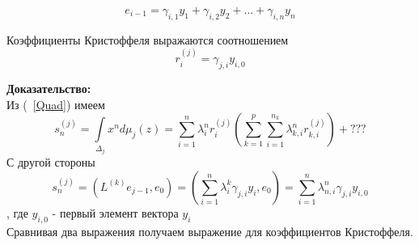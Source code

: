 \begin{equation}
e_{i-1}=\gamma_{i,1}y_1+ \gamma_{i,2}y_2 + \ldots +
\gamma_{i,n}y_n
\end{equation}
\begin{lema} Коэффициенты Кристоффеля выражаются соотношением
$$r_{i}^{(j)}=\gamma_{j,i}y_{i,0}$$
\end{lema}
\textbf{ Доказательство:} \\
Из (~\ref{Quad}) имеем
\begin{equation}
s_n^{(j)} = \int \limits_{\Delta_j} x^n d\mu_j(z) =
\sum\limits_{i=1}^{n} {\lambda_{i}^n r_{i}^{(j)}}
\left(\sum\limits_{k=1}^{p} \sum\limits_{i=1}^{n_k}
{\lambda_{k,i}^n r_{k,i}^{(j)}}\right)+ ???
\end{equation}
С другой стороны
\begin{equation}
s_n^{(j)} = (L^{(k)}e_{j-1},e_0) =\left( \sum\limits_{i=1}^{n}
{\lambda_{i}^{k}\gamma_{j,i}y_{i}},e_0\right)= \sum_{i=1}^{n}
{\lambda_{n,i}^{n}\gamma_{j,i}y_{i,0}}
\end{equation}
, где $y_{i,0}$ - первый элемент вектора $y_i$ \\
Сравнивая два выражения получаем выражение для коэффициентов
Кристоффеля.
